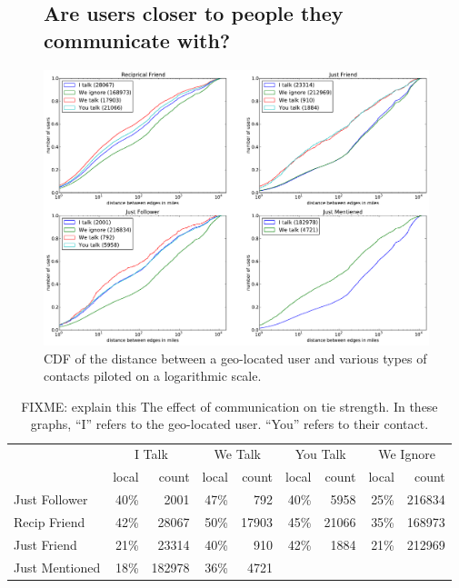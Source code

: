 \ifdefined\THESIS
    \begin{figure}[tb]
    \subsection{Are users closer to people they communicate with?}
    \centering
    \includegraphics[width=\linewidth]{figures/com_types.pdf}
    \caption{
    CDF of the distance between a geo-located user and various types of contacts
    piloted on a logarithmic scale.
    }
    \label{fig:ComTypes}
    \end{figure}
\fi

\begin{table}[tb]
\centering
\begin{tabular}{l | r r | r r | r r | r r}
    & \multicolumn{2}{c}{I Talk}
    & \multicolumn{2}{|c}{We Talk}
    & \multicolumn{2}{|c}{You Talk}
    & \multicolumn{2}{|c}{We Ignore} \\
    \cline{2-9}
    &local&count&local&count&local&count&local&count \\
    \hline
    Just Follower & 40\%&2001 & 47\%&792 & 40\%&5958 & 25\%&216834 \\
    Recip Friend & 42\%&28067 & 50\%&17903 & 45\%&21066 & 35\%&168973 \\
    Just Friend & 21\%&23314 & 40\%&910 & 42\%&1884 & 21\%&212969 \\
    Just Mentioned & 18\%&182978 & 36\%&4721 & & & & \\
\end{tabular}
\caption{
FIXME: explain this
The effect of communication on tie strength.
In these graphs, ``I'' refers to the geo-located user. ``You'' refers to their
contact.
}
\label{tab:ComTypes}
\end{table}


